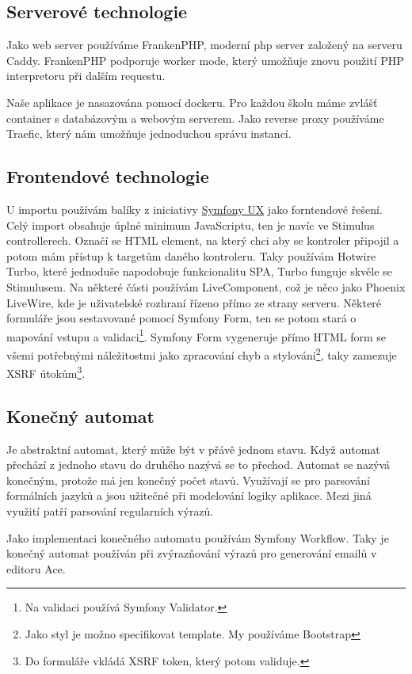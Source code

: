 \subsection{Serverové technologie}
Jako web server používáme FrankenPHP, moderní php server založený na serveru Caddy.
FrankenPHP podporuje worker mode, který umožňuje znovu použití PHP interpretoru při dalším requestu.

Naše aplikace je nasazována pomocí dockeru. Pro každou školu máme zvlášť container s databázovým a webovým serverem.
Jako reverse proxy používáme Traefic, který nám umožňuje jednoduchou správu instancí.

\subsection{Frontendové technologie}

U importu používám balíky z iniciativy \href{https://ux.symfony.com/}{Symfony UX} jako forntendové řešení.
Celý import obsahuje úplné minimum JavaScriptu, ten je navíc ve Stimulus controllerech. Označí se HTML element, na který chci aby se kontroler připojil a potom mám přístup k targetům daného kontroleru.
Taky používám Hotwire Turbo\label{ux-turbo}, které jednoduše napodobuje funkcionalitu SPA, Turbo funguje skvěle se Stimulusem.
Na některé části používám LiveComponent, což je něco jako Phoenix LiveWire, kde je uživatelské rozhraní řízeno přímo ze strany serveru. 
Některé formuláře jsou sestavované pomocí Symfony Form, ten se potom stará o mapování vstupu a validaci\footnote{Na validaci používá Symfony Validator.}.
Symfony Form vygeneruje přímo HTML form se všemi potřebnými náležitostmi jako zpracování chyb a stylování\footnote{Jako styl je možno specifikovat template. My používáme Bootstrap}, taky zamezuje XSRF útokům\footnote{Do formuláře vkládá XSRF token, který potom validuje.}.

  \subsection{Konečný automat}\label{uvod:konecny-automat}

Je abstraktní automat, který může být v přávě jednom stavu.\cite{wiki:finite-state-machine-en} Když automat přechází z jednoho stavu do druhého nazývá se to přechod.
Automat se nazývá konečným, protože má jen konečný počet stavů.
Využívají se pro parsování formálních jazyků a jsou užitečné při modelování logiky aplikace.
Mezi jiná využití patří parsování regularních výrazů.\cite{wiki:finite-state-machine-cz}

Jako implementaci konečného automatu používám Symfony Workflow.
Taky je konečný automat používán při zvýrazňování výrazů pro generování emailů v editoru Ace.



